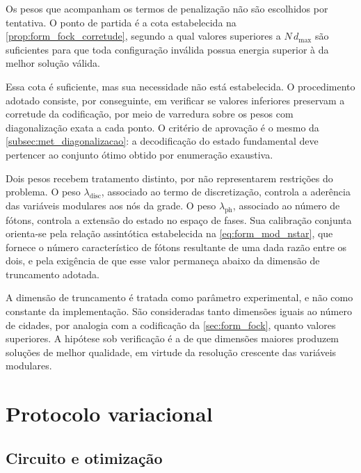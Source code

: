     Os pesos que acompanham os termos de penalização não são escolhidos por tentativa. O ponto de partida é a cota estabelecida na \autoref{prop:form_fock_corretude}, segundo a qual valores superiores a $N\,d_{\max}$ são suficientes para que toda configuração inválida possua energia superior à da melhor solução válida.

    Essa cota é suficiente, mas sua necessidade não está estabelecida. O procedimento adotado consiste, por conseguinte, em verificar se valores inferiores preservam a corretude da codificação, por meio de varredura sobre os pesos com diagonalização exata a cada ponto. O critério de aprovação é o mesmo da \autoref{subsec:met_diagonalizacao}: a decodificação do estado fundamental deve pertencer ao conjunto ótimo obtido por enumeração exaustiva.

    Dois pesos recebem tratamento distinto, por não representarem restrições do problema. O peso $\lambda_{\text{disc}}$, associado ao termo de discretização, controla a aderência das variáveis modulares aos nós da grade. O peso $\lambda_{\text{ph}}$, associado ao número de fótons, controla a extensão do estado no espaço de fases. Sua calibração conjunta orienta-se pela relação assintótica estabelecida na \autoref{eq:form_mod_nstar}, que fornece o número característico de fótons resultante de uma dada razão entre os dois, e pela exigência de que esse valor permaneça abaixo da dimensão de truncamento adotada.

    A dimensão de truncamento é tratada como parâmetro experimental, e não como constante da implementação. São consideradas tanto dimensões iguais ao número de cidades, por analogia com a codificação da \autoref{sec:form_fock}, quanto valores superiores. A hipótese sob verificação é a de que dimensões maiores produzem soluções de melhor qualidade, em virtude da resolução crescente das variáveis modulares.


\section{Protocolo variacional}\label{sec:met_vqe}

    \subsection{Circuito e otimização}\label{subsec:met_circuito}

